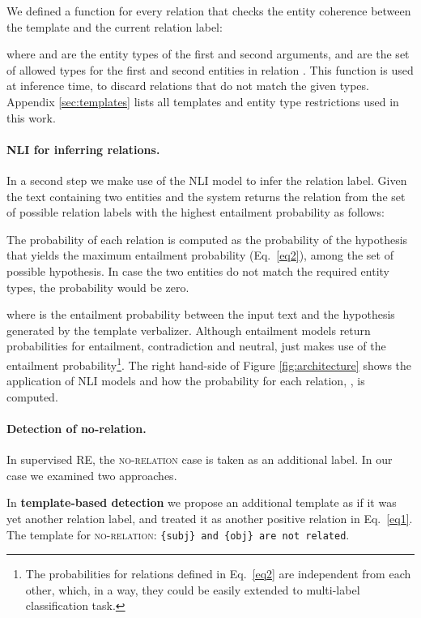 \documentclass[11pt]{article}
\begin{document}
We defined a function  for every relation  that checks the entity coherence between the template and the current relation label: 



\noindent where  and  are the entity types of the first and second arguments,  and  are the set of allowed types for the first and second entities in relation . This function is used at inference time, to discard relations that do not match the given types.
Appendix \ref{sec:templates} lists all templates and entity type restrictions used in this work. 

\paragraph{NLI for inferring relations.}
In a second step we make use of the NLI model to infer the relation label. Given the text  containing two entities  and  the system returns the relation  from the set of possible relation labels  with the highest entailment probability as follows:



The probability of each relation  is computed as the probability of the hypothesis that yields the maximum entailment probability (Eq.~\ref{eq2}), among the set of possible hypothesis. In case the two entities do not match the required entity types, the probability would be zero.




\noindent where  is the entailment probability between the input text and the hypothesis generated by the template verbalizer. Although entailment models return probabilities for entailment, contradiction and neutral,  just makes use of the entailment probability\footnote{The probabilities for relations  defined in Eq.~\ref{eq2} are independent from each other, which, in a way, they could be easily extended to multi-label  classification task.}.
The right hand-side of Figure \ref{fig:architecture} shows the application of NLI models and how the probability for each relation,  , is computed. 






\paragraph{Detection of no-relation.} In supervised RE, the \textsc{no-relation} case is taken as an additional label. In our case we examined two approaches.


In \textbf{template-based detection} we propose an additional template
as if it was yet another relation label, and treated it as another positive relation in Eq.~\ref{eq1}. The template for \textsc{no-relation}: \texttt{\{subj\} and \{obj\} are not related}.
\end{document}
